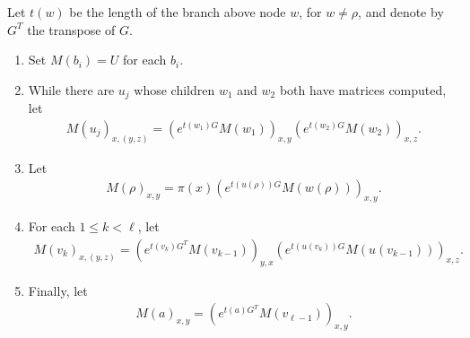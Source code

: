 \documentclass{article}
\theoremstyle{plain}
\theoremstyle{definition}
\begin{document}
Let $t(w)$ be the length of the branch above node $w$, for $w \neq \rho$,
and denote by $G^T$ the transpose of $G$.

\begin{enumerate}

  \item Set $M(b_i) = U$ for each $b_i$.

  \item While there are $u_j$ whose children $w_1$ and $w_2$ both have matrices computed, let
        \begin{align}
          M(u_j)_{x,(y,z)} = \left( e^{t(w_1) G} M(w_1) \right)_{x,y} \left( e^{t(w_2) G} M(w_2) \right)_{x,z} .
        \end{align}

  \item Let
    \begin{align}
      M(\rho)_{x,y} = \pi(x) \left( e^{t(u(\rho)) G} M(w(\rho)) \right)_{x,y}.
    \end{align}

  \item For each $1 \le k < \ell$, let
        \begin{align}
          M(v_k)_{x,(y,z)} = \left( e^{t(v_k) G^T} M(v_{k-1}) \right)_{y,x} \left( e^{t(u(v_k)) G} M(u(v_{k-1})) \right)_{x,z}  .
        \end{align}

  \item Finally, let
    \begin{align}
      M(a)_{x,y} = \left( e^{t(a) G^T} M(v_{\ell-1}) \right)_{x,y}  .
    \end{align}

\end{enumerate}

\end{document}
